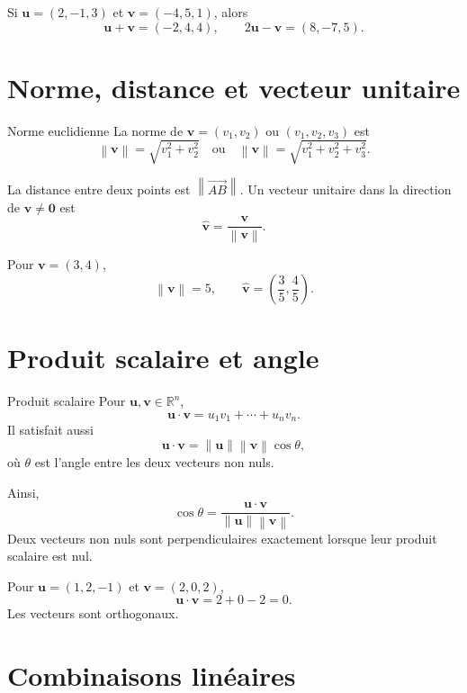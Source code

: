 \documentclass[12pt,a4paper,openany]{book}
\newcommand{\R}{\mathbb{R}}
\newcommand{\vect}[1]{\overrightarrow{#1}}
\newcommand{\norm}[1]{\left\lVert #1\right\rVert}
\begin{document}
\begin{examplebox}
Si $\mathbf u=(2,-1,3)$ et $\mathbf v=(-4,5,1)$, alors
\[
\mathbf u+\mathbf v=(-2,4,4),
\qquad
2\mathbf u-\mathbf v=(8,-7,5).
\]
\end{examplebox}

\section{Norme, distance et vecteur unitaire}

\begin{definition}{Norme euclidienne}{}
La norme de $\mathbf v=(v_1,v_2)$ ou $(v_1,v_2,v_3)$ est
\[
\norm{\mathbf v}=\sqrt{v_1^2+v_2^2}
\quad\text{ou}\quad
\norm{\mathbf v}=\sqrt{v_1^2+v_2^2+v_3^2}.
\]
\end{definition}

La distance entre deux points est $\norm{\vect{AB}}$. Un vecteur unitaire dans la direction de $\mathbf v\neq\mathbf0$ est
\[
\widehat{\mathbf v}=\frac{\mathbf v}{\norm{\mathbf v}}.
\]

\begin{examplebox}
Pour $\mathbf v=(3,4)$,
\[
\norm{\mathbf v}=5,
\qquad
\widehat{\mathbf v}=\left(\frac35,\frac45\right).
\]
\end{examplebox}

\section{Produit scalaire et angle}

\begin{definition}{Produit scalaire}{}
Pour $\mathbf u,\mathbf v\in\R^n$,
\[
\mathbf u\cdot\mathbf v=u_1v_1+\cdots+u_nv_n.
\]
Il satisfait aussi
\[
\mathbf u\cdot\mathbf v=\norm{\mathbf u}\norm{\mathbf v}\cos\theta,
\]
où $\theta$ est l'angle entre les deux vecteurs non nuls.
\end{definition}

Ainsi,
\[
\cos\theta=\frac{\mathbf u\cdot\mathbf v}{\norm{\mathbf u}\norm{\mathbf v}}.
\]
Deux vecteurs non nuls sont perpendiculaires exactement lorsque leur produit scalaire est nul.

\begin{examplebox}
Pour $\mathbf u=(1,2,-1)$ et $\mathbf v=(2,0,2)$,
\[
\mathbf u\cdot\mathbf v=2+0-2=0.
\]
Les vecteurs sont orthogonaux.
\end{examplebox}

\section{Combinaisons linéaires}
\end{document}
